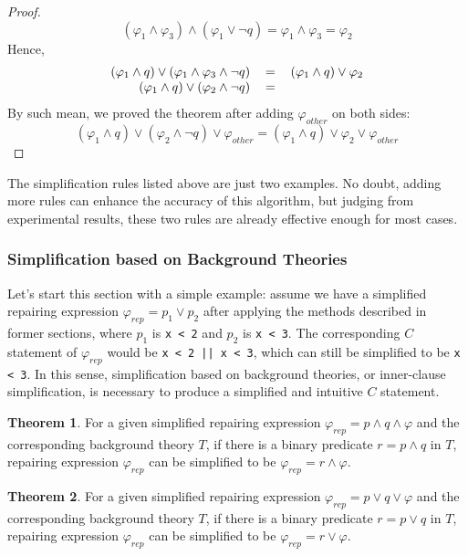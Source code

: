 \documentclass[10pt,journal,final,]{article}
\theoremstyle{definition}
\newtheorem{theorem}{Theorem}[section]
\begin{document}
\begin{proof}
\begin{equation}
(\varphi _{1} \wedge \varphi _{3}) \wedge (\varphi _{1} \vee \neg q) = \varphi _{1} \wedge \varphi _{3} = \varphi _{2}
\end{equation}
Hence,
\begin{equation}
\begin{tabular}{rcl}
$(\varphi _{1} \wedge q) \vee (\varphi _{1} \wedge \varphi _{3} \wedge \neg q)$&$=$&$(\varphi _{1} \wedge q) \vee \varphi _{2}$ \\
$(\varphi _{1} \wedge q) \vee (\varphi _{2} \wedge \neg q)$&$=$& \\
\end{tabular}
\end{equation}
By such mean, we proved the theorem after adding $\varphi _{other}$ on both sides:
\begin{equation}
(\varphi _{1} \wedge q) \vee (\varphi _{2} \wedge \neg q) \vee \varphi _{other} = (\varphi _{1} \wedge q) \vee \varphi _{2} \vee \varphi _{other}
\end{equation}
\end{proof}

The simplification rules listed above are just two examples.
No doubt, adding more rules can enhance the accuracy of this algorithm,
but judging from experimental results, these two rules are already effective enough for most cases.

\subsubsection{Simplification based on Background Theories}
Let's start this section with a simple example: assume we have a simplified repairing expression $\varphi _{rep} = p _{1} \vee p _{2}$ after applying the methods described in former sections,
where $p _{1}$ is \lstinline|x < 2| and $p _{2}$ is \lstinline|x < 3|. The corresponding $C$ statement of $\varphi _{rep}$ would be \lstinline{x < 2 || x < 3}, which can still be simplified to be \lstinline|x < 3|.
In this sense, simplification based on background theories, or inner-clause simplification, is necessary to produce a simplified and intuitive $C$ statement.

\begin{theorem}
\label{theorem:1}
For a given simplified repairing expression $\varphi _{rep} = p \wedge q \wedge \varphi$ and the corresponding background theory $T$, if there is a binary predicate $r = p \wedge q$ in $T$,
repairing expression $\varphi _{rep}$ can be simplified to be $\varphi _{rep} = r \wedge \varphi$.
\end{theorem}
\begin{theorem}
\label{theorem:2}
For a given simplified repairing expression $\varphi _{rep} = p \vee q \vee \varphi$ and the corresponding background theory $T$, if there is a binary predicate $r = p \vee q$ in $T$,
repairing expression $\varphi _{rep}$ can be simplified to be $\varphi _{rep} = r \vee \varphi$.
\end{theorem}
\end{document}
